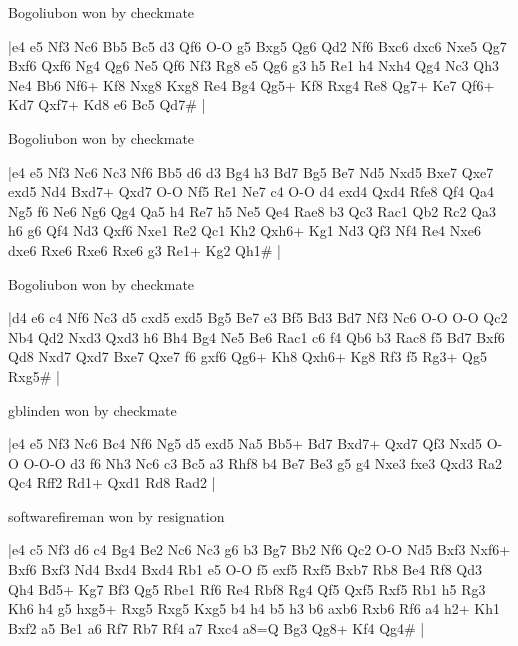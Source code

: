 \showboard

Bogoliubon won by checkmate

\makegametitle
|e4 e5 Nf3 Nc6 Bb5 Bc5 d3 Qf6 O-O g5 Bxg5 Qg6 Qd2 Nf6 Bxc6 dxc6 Nxe5 Qg7 Bxf6 Qxf6 Ng4 Qg6 Ne5 Qf6 Nf3 Rg8 e5 Qg6 g3 h5 Re1 h4 Nxh4 Qg4 Nc3 Qh3 Ne4 Bb6 Nf6+ Kf8 Nxg8 Kxg8 Re4 Bg4 Qg5+ Kf8 Rxg4 Re8 Qg7+ Ke7 Qf6+ Kd7 Qxf7+ Kd8 e6 Bc5 Qd7\#  |

\showboard

Bogoliubon won by checkmate

\makegametitle
|e4 e5 Nf3 Nc6 Nc3 Nf6 Bb5 d6 d3 Bg4 h3 Bd7 Bg5 Be7 Nd5 Nxd5 Bxe7 Qxe7 exd5 Nd4 Bxd7+ Qxd7 O-O Nf5 Re1 Ne7 c4 O-O d4 exd4 Qxd4 Rfe8 Qf4 Qa4 Ng5 f6 Ne6 Ng6 Qg4 Qa5 h4 Re7 h5 Ne5 Qe4 Rae8 b3 Qc3 Rac1 Qb2 Rc2 Qa3 h6 g6 Qf4 Nd3 Qxf6 Nxe1 Re2 Qc1 Kh2 Qxh6+ Kg1 Nd3 Qf3 Nf4 Re4 Nxe6 dxe6 Rxe6 Rxe6 Rxe6 g3 Re1+ Kg2 Qh1\#  |

\showboard

Bogoliubon won by checkmate

\makegametitle
|d4 e6 c4 Nf6 Nc3 d5 cxd5 exd5 Bg5 Be7 e3 Bf5 Bd3 Bd7 Nf3 Nc6 O-O O-O Qc2 Nb4 Qd2 Nxd3 Qxd3 h6 Bh4 Bg4 Ne5 Be6 Rac1 c6 f4 Qb6 b3 Rac8 f5 Bd7 Bxf6 Qd8 Nxd7 Qxd7 Bxe7 Qxe7 f6 gxf6 Qg6+ Kh8 Qxh6+ Kg8 Rf3 f5 Rg3+ Qg5 Rxg5\#  |

\showboard

gblinden won by checkmate

\makegametitle
|e4 e5 Nf3 Nc6 Bc4 Nf6 Ng5 d5 exd5 Na5 Bb5+ Bd7 Bxd7+ Qxd7 Qf3 Nxd5 O-O O-O-O d3 f6 Nh3 Nc6 c3 Bc5 a3 Rhf8 b4 Be7 Be3 g5 g4 Nxe3 fxe3 Qxd3 Ra2 Qc4 Rff2 Rd1+ Qxd1 Rd8 Rad2  |

\showboard

softwarefireman won by resignation

\makegametitle
|e4 c5 Nf3 d6 c4 Bg4 Be2 Nc6 Nc3 g6 b3 Bg7 Bb2 Nf6 Qc2 O-O Nd5 Bxf3 Nxf6+ Bxf6 Bxf3 Nd4 Bxd4 Bxd4 Rb1 e5 O-O f5 exf5 Rxf5 Bxb7 Rb8 Be4 Rf8 Qd3 Qh4 Bd5+ Kg7 Bf3 Qg5 Rbe1 Rf6 Re4 Rbf8 Rg4 Qf5 Qxf5 Rxf5 Rb1 h5 Rg3 Kh6 h4 g5 hxg5+ Rxg5 Rxg5 Kxg5 b4 h4 b5 h3 b6 axb6 Rxb6 Rf6 a4 h2+ Kh1 Bxf2 a5 Be1 a6 Rf7 Rb7 Rf4 a7 Rxc4 a8=Q Bg3 Qg8+ Kf4 Qg4\#  |


